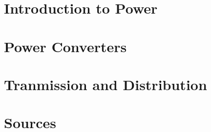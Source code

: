 \documentclass{article}
\begin{document}
\tableofcontents
\newpage

\section{Introduction to Power}



\section{Power Converters}


\section{Tranmission and Distribution}








\newpage
\section{Sources}

\end{document}
